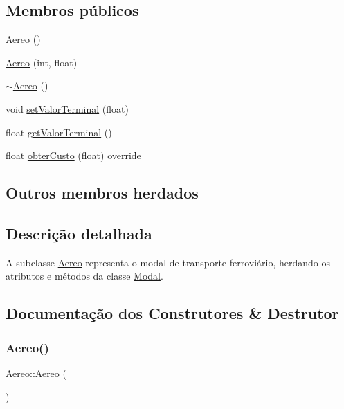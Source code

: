 \subsection*{Membros públicos}
\begin{DoxyCompactItemize}
\item 
\hyperlink{classAereo_a1dae1567e86d1349eae16245ae4a8e29}{Aereo} ()
\item 
\hyperlink{classAereo_a1630b4982dcbc3ff2705bf1c30bc4712}{Aereo} (int, float)
\item 
\hyperlink{classAereo_a1fdc694bc1f263674c755e99fe08c33c}{$\sim$\+Aereo} ()
\item 
void \hyperlink{classAereo_ae2ee9b18fa17516d37250efdb6f617c7}{set\+Valor\+Terminal} (float)
\item 
float \hyperlink{classAereo_a33aec047d2f25dccfdc9e90ef7f5b12e}{get\+Valor\+Terminal} ()
\item 
float \hyperlink{classAereo_aebe18688abfe40893831960f4a8889d9}{obter\+Custo} (float) override
\end{DoxyCompactItemize}
\subsection*{Outros membros herdados}


\subsection{Descrição detalhada}
A subclasse \hyperlink{classAereo}{Aereo} representa o modal de transporte ferroviário, herdando os atributos e métodos da classe \hyperlink{classModal}{Modal}. 

\subsection{Documentação dos Construtores \& Destrutor}
\mbox{\label{classAereo_a1dae1567e86d1349eae16245ae4a8e29}} 
\subsubsection{\texorpdfstring{Aereo()}{Aereo()}\hspace{0.1cm}{\footnotesize\ttfamily [1/2]}}
{\footnotesize\ttfamily Aereo\+::\+Aereo (\begin{DoxyParamCaption}{ }\end{DoxyParamCaption})}

